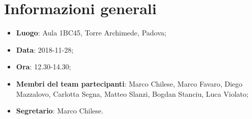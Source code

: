 \section{Informazioni generali}
\begin{itemize}
	\item \textbf{Luogo}: Aula 1BC45, Torre Archimede, Padova;
	\item \textbf{Data}: 2018-11-28;
	\item \textbf{Ora}:	12.30-14.30;
	\item \textbf{Membri del team partecipanti}: Marco Chilese, Marco Favaro, Diego Mazzalovo, Carlotta Segna, Matteo Slanzi, Bogdan Stanciu, Luca Violato;
	\item \textbf{Segretario}: Marco Chilese.
\end{itemize}